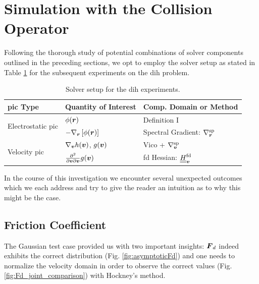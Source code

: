 \section{Simulation with the Collision Operator}
\label{section:sim_with_collisions}

Following the thorough study of potential combinations of solver components outlined in the
preceding sections, we opt to employ the solver setup as stated in Table 
\ref{table:DIHsolverCombination} for the subsequent experiments on the \gls{dih} problem.

\begin{table}
    \renewcommand*\arraystretch{1.5}
    \centering
    \caption{Solver setup for the \gls{dih} experiments.}
    \label{table:DIHsolverCombination}
    \begin{tabular}{|l|l|l|}
\hline
\textbf{\gls{pic} Type}                           & \textbf{Quantity of Interest}
                                            & \textbf{Comp. Domain or Method}     \\ \hline
\multirow{2}{*}{Electrostatic \gls{pic}} & $\phi(\boldsymbol{r})$
                                   & Definition I                 \\ \cline{2-3} 
                                   & $- \nabla_{\boldsymbol{r}} \left[ \phi(\boldsymbol{r}) \right]$
                                   & Spectral Gradient: $\nabla_{\boldsymbol{r}}^{\text{sp}}$          \\ \hline
\multirow{2}{*}{Velocity \gls{pic}}      & $\nabla_{\boldsymbol{v}} h(\boldsymbol{v})$, $g(\boldsymbol{v})$                                        
                                   & Vico + $\nabla_{\boldsymbol{v}}^{\text{sp}}$                       \\ \cline{2-3} 
                                   & $\frac{\partial^2}{\partial \boldsymbol{v} \partial \boldsymbol{v}} g(\boldsymbol{v})$
                                   & \gls{fd} Hessian: $\underline{\underline{H}}_{\boldsymbol{v}}^{\text{fd}}$           \\
\hline
\end{tabular}
\end{table}

In the course of this investigation we encounter several unexpected outcomes which we each address and 
try to give the reader an intuition as to why this might be the case.

\subsection{Friction Coefficient}
\label{subsection:friction_coefficient}

The Gaussian test case provided us with two important insights: $\boldsymbol{F}_d$
indeed exhibits the correct distribution (Fig. \ref{fig:asymptoticFd}) and one needs to normalize
the velocity domain in order to observe the correct values (Fig. \ref{fig:Fd_joint_comparison}) with
Hockney's method.

